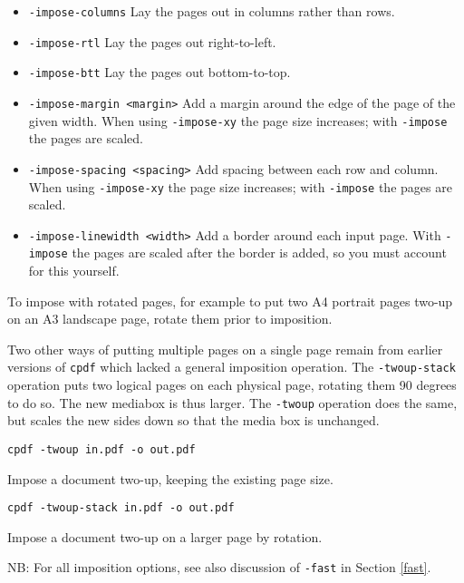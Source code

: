 \documentclass{book}
\begin{document}
\begin{itemize}
\item \texttt{-impose-columns} Lay the pages out in columns rather than rows.
\item \texttt{-impose-rtl} Lay the pages out right-to-left.
\item \texttt{-impose-btt} Lay the pages out bottom-to-top.
\item \texttt{-impose-margin <margin>} Add a margin around the edge of the page of the given width. When using \texttt{-impose-xy} the page size increases; with \texttt{-impose} the pages are scaled.
\item \texttt{-impose-spacing <spacing>} Add spacing between each row and column. When using \texttt{-impose-xy} the page size increases; with \texttt{-impose} the pages are scaled.
\item \texttt{-impose-linewidth <width>} Add a border around each input page. With \texttt{-impose} the pages are scaled after the border is added, so you must account for this yourself.

\end{itemize}

To impose with rotated pages, for example to put two A4 portrait pages two-up on an A3 landscape page, rotate them prior to imposition.

Two other ways of putting multiple pages on a single page remain from earlier versions of \texttt{cpdf} which lacked a general imposition operation.  The \texttt{-twoup-stack} operation puts two logical pages on each physical
page, rotating them 90 degrees to do so. The new mediabox is thus larger. The \texttt{-twoup} operation does the same, but scales the new sides down so
that the media box is unchanged.

  \begin{framed}
    \small\verb!cpdf -twoup in.pdf -o out.pdf!
 
    \vspace{2.5mm}
    \noindent Impose a document two-up, keeping the existing page size.

    \vspace{2.5mm}
    \small\verb!cpdf -twoup-stack in.pdf -o out.pdf!
 
    \vspace{2.5mm}
    \noindent Impose a document two-up on a larger page by rotation. 
  \end{framed}
 
NB: For all imposition options, see also discussion of \texttt{-fast} in Section \ref{fast}.
\end{document}

